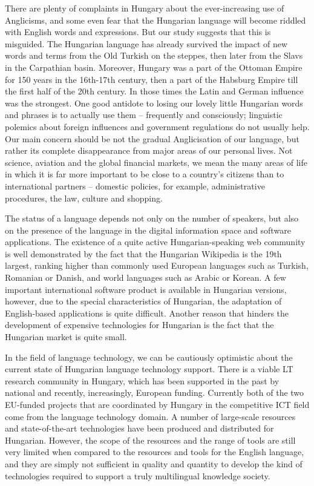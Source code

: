 \begin{multicols}{2}
  There are plenty of complaints in Hungary about the ever-increasing use of Anglicisms, and some even fear that the Hungarian language will become riddled with English words and expressions. But our study suggests that this is misguided. The Hungarian language has already survived the impact of new words and terms from the Old Turkish on the steppes, then later from the Slavs in the Carpathian basin. Moreover, Hungary was a part of the Ottoman Empire for 150 years in the 16th-17th century, then a part of the Habsburg Empire till the first half of the 20th century. In those times the Latin and German influence was the strongest. One good antidote to losing our lovely little Hungarian words and phrases is to actually use them -- frequently and consciously; linguistic polemics about foreign influences and government regulations do not usually help. Our main concern should be not the gradual Anglicisation of our language, but rather its complete disappearance from major areas of our personal lives. Not science, aviation and the global financial markets, we mean the many areas of life in which it is far more important to be close to a country’s citizens than to international partners -- domestic policies, for example, administrative procedures, the law, culture and shopping.

  The status of a language depends not only on the number of speakers, but also on the presence of the language in the digital information space and software applications. The existence of a quite active Hungarian-speaking web community is well demonstrated by the fact that the Hungarian Wikipedia is the 19th largest, ranking higher than commonly used European languages such as Turkish, Romanian or Danish, and world languages such as Arabic or Korean. A few important international software product is available in Hungarian versions, however, due to the special characteristics of Hungarian, the adaptation of English-based applications is quite difficult. Another reason that hinders the development of expensive technologies for Hungarian is the fact that the Hungarian market is quite small. 

  In the field of language technology, we can be cautiously optimistic about the current state of Hungarian language technology support. There is a viable LT research community in Hungary, which has been supported in the past by national and recently, increasingly, European funding.  Currently both of the two EU-funded projects that are coordinated by Hungary in the competitive ICT field come from the language technology domain. A number of large-scale resources and state-of-the-art technologies have been produced and distributed for Hungarian. However, the scope of the resources and the range of tools are still very limited when compared to the resources and tools for the English language, and they are simply not sufficient in quality and quantity to develop the kind of technologies required to support a truly multilingual knowledge society.


\end{multicols}
